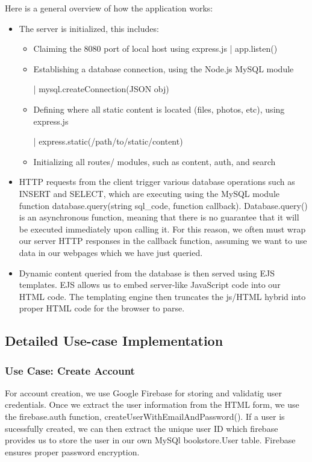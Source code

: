 \documentclass[letter, 12pt, titlepage]{article}
\begin{document}
	Here is a general overview of how the application works:
	\begin{itemize}
		\item The server is initialized, this includes:
			\begin{itemize}
				\item Claiming the 8080 port of local host using express.js | app.listen()
				\item Establishing a database connection, using the Node.js MySQL module 
					
					| mysql.createConnection(JSON obj)
				\item Defining where all static content is located  (files, photos, etc), using express.js
					
					| express.static(/path/to/static/content)
				\item Initializing all routes/ modules, such as content, auth, and search
			\end{itemize}
		\item HTTP requests from the client trigger various database operations such as INSERT and SELECT, which are executing using the MySQL module function database.query(string sql\_code, function callback). Database.query() is an asynchronous function, meaning that there is no guarantee that it will be executed immediately upon calling it. For this reason, we often must wrap our server HTTP responses in the callback function, assuming we want to use data in our webpages which we have just queried.
		\item Dynamic content queried from the database is then served using EJS templates.
			EJS allows us to embed server-like JavaScript code into our HTML code. 
			The templating engine then truncates the js/HTML hybrid into proper HTML code for the browser to parse.
	\end{itemize}
\newpage
\subsection{Detailed Use-case Implementation}



	\subsubsection{Use Case: Create Account}
For account creation, we use Google Firebase for storing and validatig user credentials. Once we extract the user information from the HTML form, we use the firebase.auth function, createUserWithEmailAndPassword(). If a user is sucessfully created, we can then extract the unique user ID which firebase provides us to store the user in our own MySQl bookstore.User table. Firebase ensures proper password encryption. 
\end{document}
